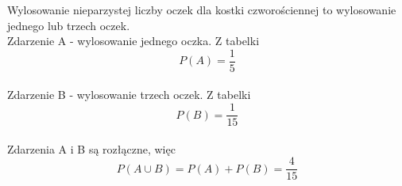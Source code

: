 \medskip
{} 
\medskip

Wylosowanie nieparzystej liczby oczek dla kostki czworościennej to wylosowanie jednego lub trzech oczek. \\
Zdarzenie A - wylosowanie jednego oczka. Z tabelki 
\[ P(A)=\frac{1}{5} \] \\
Zdarzenie B - wylosowanie trzech oczek. Z tabelki 
\[ P(B)=\frac{1}{15} \] \\
Zdarzenia A i B są rozłączne, więc
 \[ P(A{\cup}B) = P(A) + P(B) = \frac{4}{15} \] \\
